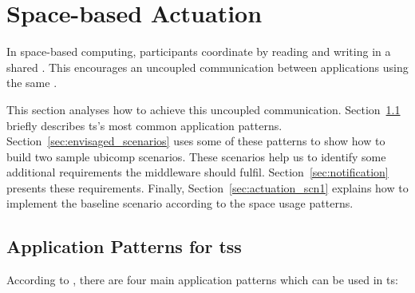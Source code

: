 \section{Space-based Actuation}
\label{sec:actuation_space}



In space-based computing, participants coordinate by reading and writing in a shared \Space{}.
This encourages an uncoupled communication between applications using the same \Space{}.


This section analyses how to achieve this uncoupled communication.
Section~\ref{sec:ts_patterns} briefly describes \acl{ts}'s most common application patterns. %
Section~\ref{sec:envisaged_scenarios} uses some of these patterns to show how to build two sample \ac{ubicomp} scenarios.
These scenarios help us to identify some additional requirements the middleware should fulfil.
Section~\ref{sec:notification} presents these requirements. %
Finally, Section~\ref{sec:actuation_scn1} explains how to implement the baseline scenario according to the space usage patterns. %



\subsection{Application Patterns for \aclp{ts}}
\label{sec:ts_patterns}

According to \citet{freeman_javaspaces_1999}, there are four main application patterns which can be used in \ac{ts}:

